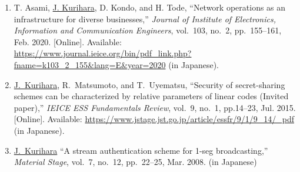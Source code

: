 \begin{enumerate}
 \item T. Asami, \underline{J. Kurihara}, D. Kondo, and H. Tode, ``Network operations as an infrastructure for diverse businesses,'' \textit{Journal of Institute of Electronics, Information and Communication Engineers}, vol.~103, no.~2, pp.~155--161, Feb. 2020. [Online]. Available: \url{https://www.journal.ieice.org/bin/pdf_link.php?fname=k103_2_155&lang=E&year=2020} (in Japanese).
 \item \underline{J.~Kurihara}, R.~Matsumoto, and T.~Uyematsu, ``Security of secret-sharing schemes can be characterized by relative parameters of linear codes (Invited paper),'' \textit{IEICE ESS Fundamentals Review}, vol.~9, no.~1, pp.14--23, Jul. 2015. [Online]. Available: \url{https://www.jstage.jst.go.jp/article/essfr/9/1/9_14/_pdf} (in Japanese).
 \item \underline{J.~Kurihara} ``A stream authentication scheme for 1-seg broadcasting,'' \textit{Material Stage}, vol.~7, no.~12, pp.~22--25, Mar. 2008. (in Japanese)
\end{enumerate}